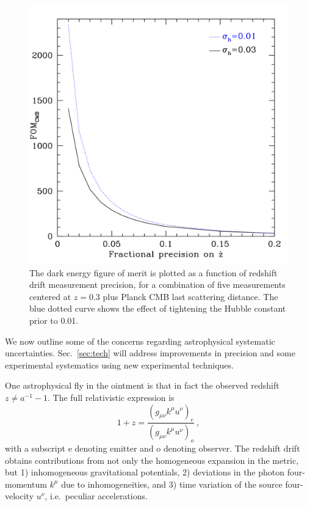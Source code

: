 \documentclass[preprint2, 10pt]{aastex}
\newcommand{\be}{\begin{equation}}
\newcommand{\ee}{\end{equation}}
\begin{document}
{%
\begin{figure}[!htbp] 
   \centering
  \includegraphics[width=\columnwidth]{fomprec.pdf}
\caption{The dark energy figure of merit is plotted as a function of 
redshift drift measurement precision, for a combination of five measurements 
centered at $z=0.3$ plus Planck CMB last scattering distance. The blue 
dotted curve shows the effect of tightening the Hubble constant prior to 
0.01. 
} 
\label{fig:fomprec} 
\end{figure}


We now outline 
some of the 
concerns regarding astrophysical systematic uncertainties. Sec.~\ref{sec:tech} 
will address improvements in precision and some experimental systematics 
using new experimental techniques. 

One astrophysical fly in the ointment is that in fact the observed redshift 
$z\ne a^{-1}-1$. The full relativistic expression is 
\be 
1+z=\frac{(g_{\mu\nu}k^\mu u^\nu)_e}{(g_{\mu\nu}k^\mu u^\nu)_o}\ , 
\label{eq:zgen} 
\ee 
with a subscript e denoting emitter and o denoting observer. 
The redshift drift obtains contributions from not only the 
homogeneous expansion in the metric, but 1) inhomogeneous gravitational 
potentials, 2) deviations in the photon four-momentum $k^\mu$ due to 
inhomogeneities, and 3) time variation of the source four-velocity $u^\nu$, 
i.e.\ peculiar accelerations.  

}
\end{document}
